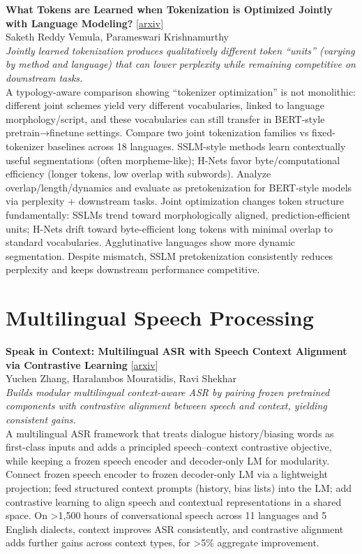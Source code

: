 \documentclass[12pt,letterpaper]{article}
\begin{document}
\medskip

{\small\textbf{What Tokens are Learned when Tokenization is Optimized Jointly with Language Modeling?}} {\scriptsize[\href{https://arxiv.org/abs/2608.17325}{arxiv}]}\\
{\scriptsize Saketh Reddy Vemula, Parameswari Krishnamurthy}\\

{\small\textit{Jointly learned tokenization produces qualitatively different token ``units'' (varying by method and language) that can lower perplexity while remaining competitive on downstream tasks.}}\\[1pt]
{\footnotesize A typology-aware comparison showing ``tokenizer optimization'' is not monolithic: different joint schemes yield very different vocabularies, linked to language morphology/script, and these vocabularies can still transfer in BERT-style pretrain→finetune settings. Compare two joint tokenization families vs fixed-tokenizer baselines across 18 languages. SSLM-style methods learn contextually useful segmentations (often morpheme-like); H-Nets favor byte/computational efficiency (longer tokens, low overlap with subwords). Analyze overlap/length/dynamics and evaluate as pretokenization for BERT-style models via perplexity + downstream tasks. Joint optimization changes token structure fundamentally: SSLMs trend toward morphologically aligned, prediction-efficient units; H-Nets drift toward byte-efficient long tokens with minimal overlap to standard vocabularies. Agglutinative languages show more dynamic segmentation. Despite mismatch, SSLM pretokenization consistently reduces perplexity and keeps downstream performance competitive.}

\medskip


\section*{Multilingual Speech Processing}

{\small\textbf{Speak in Context: Multilingual ASR with Speech Context Alignment via Contrastive Learning}} {\scriptsize[\href{https://arxiv.org/abs/2603.06505}{arxiv}]}\\
{\scriptsize Yuchen Zhang, Haralambos Mouratidis, Ravi Shekhar}\\

{\small\textit{Builds modular multilingual context-aware ASR by pairing frozen pretrained components with contrastive alignment between speech and context, yielding consistent gains.}}\\[1pt]
{\footnotesize A multilingual ASR framework that treats dialogue history/biasing words as first-class inputs and adds a principled speech--context contrastive objective, while keeping a frozen speech encoder and decoder-only LM for modularity. Connect frozen speech encoder to frozen decoder-only LM via a lightweight projection; feed structured context prompts (history, bias lists) into the LM; add contrastive learning to align speech and contextual representations in a shared space. On >1,500 hours of conversational speech across 11 languages and 5 English dialects, context improves ASR consistently, and contrastive alignment adds further gains across context types, for >5\% aggregate improvement.}
\end{document}
